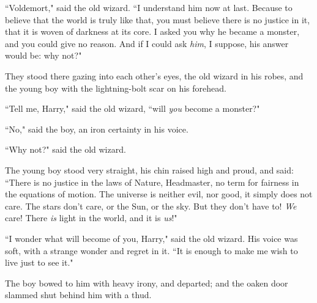 ``Voldemort," said the old wizard. ``I understand him now at last. Because to believe that the world is truly like that, you must believe there is no justice in it, that it is woven of darkness at its core. I asked you why he became a monster, and you could give no reason. And if I could ask \emph{him}, I suppose, his answer would be: why not?"

\later

They stood there gazing into each other's eyes, the old wizard in his robes, and the young boy with the lightning-bolt scar on his forehead.

``Tell me, Harry," said the old wizard, ``will \emph{you} become a monster?"

``No," said the boy, an iron certainty in his voice.

``Why not?" said the old wizard.

The young boy stood very straight, his chin raised high and proud, and said: ``There is no justice in the laws of Nature, Headmaster, no term for fairness in the equations of motion. The universe is neither evil, nor good, it simply does not care. The stars don't care, or the Sun, or the sky. But they don't have to! \emph{We} care! There \emph{is} light in the world, and it is \emph{us}!"

``I wonder what will become of you, Harry," said the old wizard. His voice was soft, with a strange wonder and regret in it. ``It is enough to make me wish to live just to see it."

The boy bowed to him with heavy irony, and departed; and the oaken door slammed shut behind him with a thud.

